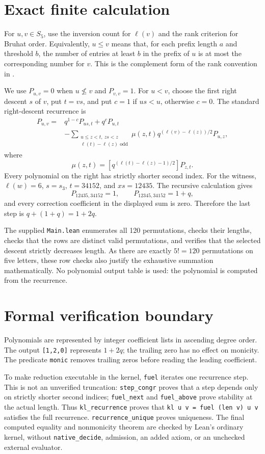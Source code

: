 \documentclass[11pt]{article}
\newcommand{\elln}{\ell}
\begin{document}
\section{Exact finite calculation}
For $u,v\in S_5$, use the inversion count for $\elln(v)$ and the rank criterion for Bruhat order. Equivalently, $u\leq v$ means that, for each prefix length $a$ and threshold $b$, the number of entries at least $b$ in the prefix of $u$ is at most the corresponding number for $v$. This is the complement form of the rank convention in \cite[Section 2.1]{woo}.

We use $P_{u,v}=0$ when $u\not\leq v$ and $P_{v,v}=1$. For $u<v$, choose the first right descent $s$ of $v$, put $t=vs$, and put $c=1$ if $us<u$, otherwise $c=0$. The standard right-descent recurrence \cite[Theorem 5.1.7]{bb} is
\begin{align*}
 P_{u,v}={}&q^{1-c}P_{us,t}+q^cP_{u,t}\\
 &-\sum_{\substack{u\leq z<t,\ zs<z\\\elln(t)-\elln(z)\text{ odd}}}
 \mu(z,t)q^{(\elln(v)-\elln(z))/2}P_{u,z},
\end{align*}
where
\[
 \mu(z,t)=[q^{(\elln(t)-\elln(z)-1)/2}]P_{z,t}.
\]
Every polynomial on the right has strictly shorter second index. For the witness, $\elln(w)=6$, $s=s_3$, $t=34152$, and $xs=12435$. The recursive calculation gives
\[
 P_{12435,34152}=1,\qquad P_{12345,34152}=1+q,
\]
and every correction coefficient in the displayed sum is zero. Therefore the last step is $q+(1+q)=1+2q$.

The supplied \texttt{Main.lean} enumerates all 120 permutations, checks their lengths, checks that the rows are distinct valid permutations, and verifies that the selected descent strictly decreases length. As there are exactly $5!=120$ permutations on five letters, these row checks also justify the exhaustive summation mathematically. No polynomial output table is used: the polynomial is computed from the recurrence.

\section{Formal verification boundary}
Polynomials are represented by integer coefficient lists in ascending degree order. The output \texttt{[1,2,0]} represents $1+2q$; the trailing zero has no effect on monicity. The predicate \texttt{monic} removes trailing zeros before reading the leading coefficient.

To make reduction executable in the kernel, \texttt{fuel} iterates one recurrence step. This is not an unverified truncation: \texttt{step\_congr} proves that a step depends only on strictly shorter second indices; \texttt{fuel\_next} and \texttt{fuel\_above} prove stability at the actual length. Thus \texttt{kl\_recurrence} proves that \texttt{kl u v = fuel (len v) u v} satisfies the full recurrence. \texttt{recurrence\_unique} proves uniqueness. The final computed equality and nonmonicity theorem are checked by Lean's ordinary kernel, without \texttt{native\_decide}, admission, an added axiom, or an unchecked external evaluator.
\end{document}
